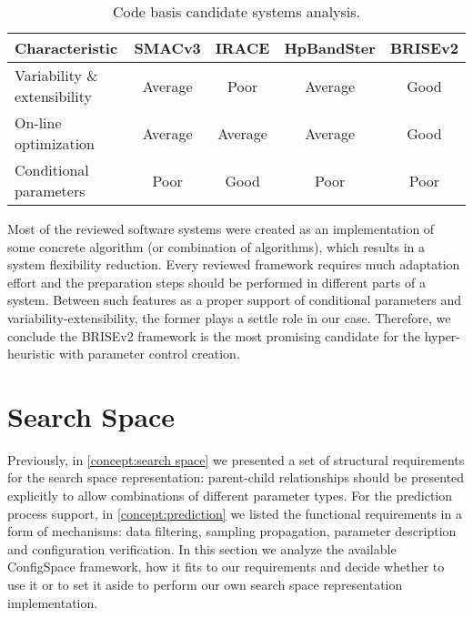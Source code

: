 \begin{table}[h!]
	\centering
	\begin{tabular}{l||cccc}
		\textbf{Characteristic} & \textbf{SMACv3}& \textbf{IRACE} & \textbf{HpBandSter} & \textbf{BRISEv2} \\
		\hline
		\hline
		Variability \& extensibility & \cellcolor{yellow!25}Average & \cellcolor{red!25}Poor & \cellcolor{yellow!25}Average & \cellcolor{green!25}Good \\
	
		On-line optimization & \cellcolor{yellow!25}Average & \cellcolor{yellow!25}Average & \cellcolor{yellow!25}Average & \cellcolor{green!25}Good \\
	
		Conditional parameters & \cellcolor{red!25}Poor & \cellcolor{green!25}Good & \cellcolor{red!25}Poor & \cellcolor{red!25}Poor \\
	\end{tabular}
	\caption{Code basis candidate systems analysis.}
	\label{iml: table code basis selection}
\end{table}

Most of the reviewed software systems were created as an implementation of some concrete algorithm (or combination of algorithms), which results in a system flexibility reduction. Every reviewed framework requires much adaptation effort and the preparation steps should be performed in different parts of a system. Between such features as a proper support of conditional parameters and variability-extensibility, the former plays a settle role in our case. Therefore, we conclude the BRISEv2 framework is the most promising candidate for the hyper-heuristic with parameter control creation.

\section{Search Space}\label{impl: search space}
Previously, in \cref{concept:search space} we presented a set of structural requirements for the search space representation: parent-child relationships should be presented explicitly to allow combinations of different parameter types. For the prediction process support, in \cref{concept:prediction} we listed the functional requirements in a form of mechanisms: data filtering, sampling propagation, parameter description and configuration verification. In this section we analyze the available ConfigSpace framework, how it fits to our requirements and decide whether to use it or to set it aside to perform our own search space representation implementation.

